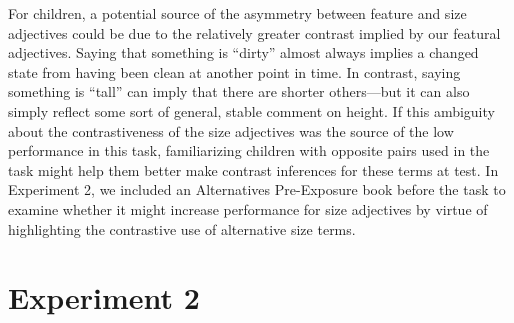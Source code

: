 \documentclass[man]{apa2}
\begin{document}

For children, a potential source of the asymmetry between feature and size adjectives could be due to the relatively greater contrast implied by our featural adjectives. Saying that something is ``dirty'' almost always implies a changed state from having been clean at another point in time. In contrast, saying something is ``tall'' can imply that there are shorter others---but it can also simply reflect some sort of general, stable comment on height. If this ambiguity about the contrastiveness of the size adjectives was the source of the low performance in this task, familiarizing children with opposite pairs used in the task might help them better make contrast inferences for these terms at test. In Experiment 2, we included an Alternatives Pre-Exposure book before the task to examine whether it might increase performance for size adjectives by virtue of highlighting the contrastive use of alternative size terms. 




\section{Experiment 2}
\end{document}
